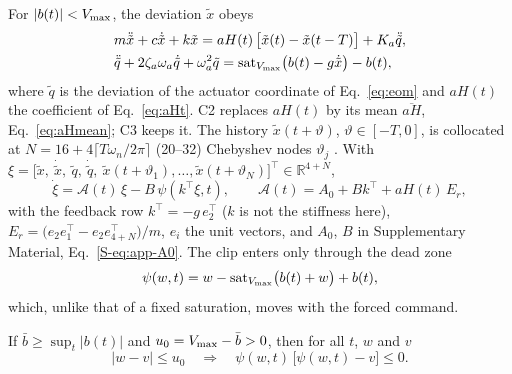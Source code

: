 For $\lvert b(t)\rvert<V_{\max}$, the deviation $\tilde x$ obeys
\begin{equation}\label{eq:dev}
\begin{aligned}
&m\ddot{\tilde x}+c\dot{\tilde x}+k\tilde x=aH(t)\,\big[\tilde x(t)-\tilde x(t-T)\big]+K_a\ddot{\tilde q},\\
&\ddot{\tilde q}+2\zeta_a\omega_a\dot{\tilde q}+\omega_a^2\tilde q=\operatorname{sat}_{V_{\max}}\!\big(b(t)-g\dot{\tilde x}\big)-b(t),
\end{aligned}
\end{equation}
where $\tilde q$ is the deviation of the actuator coordinate of Eq.~\eqref{eq:eom} and $aH(t)$ the coefficient of Eq.~\eqref{eq:aHt}. C2 replaces $aH(t)$ by its mean $\overline{aH}$, Eq.~\eqref{eq:aHmean}; C3 keeps it. The history $\tilde x(t+\vartheta)$, $\vartheta\in[-T,0]$, is collocated at $N=16+4\lceil T\omega_n/2\pi\rceil$ (20--32) Chebyshev nodes $\vartheta_j$ \citep{breda2005pseudospectral,breda2015book}. With $\xi=\big[\tilde x,\ \dot{\tilde x},\ \tilde q,\ \dot{\tilde q},\ \tilde x(t+\vartheta_1),\dots,\tilde x(t+\vartheta_N)\big]^\top\in\mathbb R^{4+N}$,
\begin{equation}\label{eq:coll}
\dot\xi=\mathcal A(t)\,\xi-B\,\psi(k^\top\xi,t),\qquad \mathcal A(t)=A_0+Bk^\top+aH(t)\,E_r,
\end{equation}
with the feedback row $k^\top=-g\,e_2^\top$ ($k$ is not the stiffness here), $E_r=\big(e_2e_1^\top-e_2e_{4+N}^\top\big)/m$, $e_i$ the unit vectors, and $A_0$, $B$ in Supplementary Material, Eq.~\eqref{S-eq:app-A0}. The clip enters only through the dead zone
\begin{equation}\label{eq:deadzone}
\psi(w,t)=w-\operatorname{sat}_{V_{\max}}\!\big(b(t)+w\big)+b(t),
\end{equation}
which, unlike that of a fixed saturation, moves with the forced command.

\begin{lemma}\label{lem:sector}
If $\bar b\ge\sup_t\lvert b(t)\rvert$ and $u_0=V_{\max}-\bar b>0$, then for all $t$, $w$ and $v$
\begin{equation}\label{eq:sector}
\lvert w-v\rvert\le u_0\quad\Longrightarrow\quad\psi(w,t)\,\big[\psi(w,t)-v\big]\le0 .
\end{equation}
\end{lemma}

